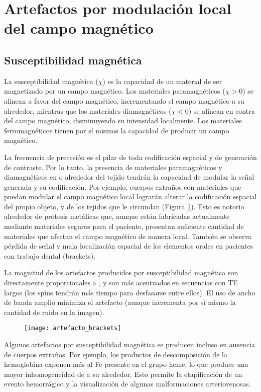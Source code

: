 \section{Artefactos por modulación local del campo magnético}
\subsection{Susceptibilidad magnética}
La susceptibilidad magnética ($\chi$) es la capacidad de un material de ser magnetizado por un campo magnético. Los materiales paramagnéticos ($\chi>0$) se alinean a favor del campo magnético, incrementando el campo magnético a su alrededor, mientras que los materiales diamagnéticos ($\chi<0$) se alinean en contra del campo magnético, disminuyendo su intensidad localmente. Los materiales ferromagnéticos tienen por sí mismos la capacidad de producir un campo magnético.

La frecuencia de precesión es el pilar de toda codificación espacial y de generación de contraste. Por lo tanto, la presencia de materiales paramagnéticos y diamagnéticos en o alrededor del tejido tendrán la capacidad de modular la señal generada y su codificación. Por ejemplo, cuerpos extraños con materiales que puedan modular el campo magnético local lograrán alterar la codificación espacial del propio objeto, y de los tejidos que le circundan (Figura \ref{fig:artefacto_brackets}). Esto es notorio alrededor de prótesis metálicas que, aunque están fabricadas actualmente mediante materiales seguros para el paciente, presentan suficiente cantidad de materiales que afectan el campo magnético de manera local. También se observa pérdida de señal y mala localización espacial de los elementos orales en pacientes con trabajo dental (brackets). 

La magnitud de los artefactos producidos por susceptibilidad magnética son directamente proporcionales a \Bzero, y son más acentuados en secuencias con TE largos (los spins tendrán más tiempo para desfasarse entre ellos). El uso de ancho de banda amplio minimiza el artefacto (aunque incrementa por sí mismo la cantidad de ruido en la imagen).


\begin{figure}[htb]
 \begin{figg}
   \texttt{[image: artefacto\_brackets]}
   \caption{\figurapendiente}
 \label{fig:artefacto_brackets}
 \end{figg}
\end{figure}


Algunos artefactos por susceptibilidad magnética se producen incluso en ausencia de cuerpos extraños. Por ejemplo, los productos de descomposición de la hemoglobina exponen más al Fe presente en el grupo heme, lo que produce una mayor inhomogeneidad de \Bzero a su alrededor. Esto permite la etapificación de un evento hemorrágico y la visualización de algunas malformaciones arteriovenosas. 

